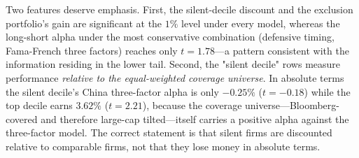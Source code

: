 \documentclass[12pt]{article}
\begin{document}
Two features deserve emphasis. First, the silent-decile discount and the
exclusion portfolio's gain are significant at the $1\%$ level under every
model, whereas the long-short alpha under the most conservative combination
(defensive timing, Fama-French three factors) reaches only $t=1.78$---a pattern
consistent with the information residing in the lower tail. Second, the
"silent decile" rows measure performance \emph{relative to the equal-weighted
coverage universe}. In absolute terms the silent decile's China three-factor
alpha is only $-0.25\%$ ($t=-0.18$) while the top decile earns $3.62\%$
($t=2.21$), because the coverage universe---Bloomberg-covered and therefore
large-cap tilted---itself carries a positive alpha against the three-factor
model. The correct statement is that silent firms are discounted relative to
comparable firms, not that they lose money in absolute terms.
\end{document}
